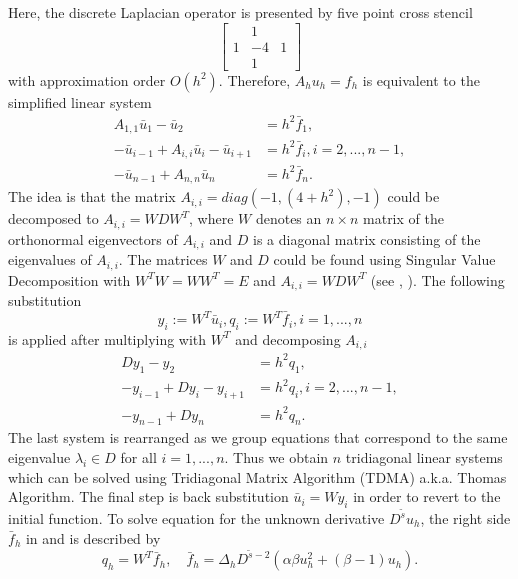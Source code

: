 \documentclass[11pt,a4paper,twoside]{article}
\begin{document}
Here, the discrete Laplacian operator is presented by five point cross stencil
\[
\begin{bmatrix}
            &  1  &  \\
    1     &  -4    & 1\\
            &  1  & 
\end{bmatrix}
\]
with approximation order $O(h^2)$. Therefore, $A_h u_h = f_h$ is equivalent to the simplified linear system
\begin{align}
A_{1,1}\bar u_1 - \bar u_2 &= h^2\bar f_1, \nonumber \\
- \bar u_{i-1}  + A_{i,i}\bar u_i - \bar u_{i+1}  &= h^2\bar f_i, i = 2,...,n-1, \nonumber \\
- \bar u_{n-1} + A_{n,n}\bar u_n &= h^2\bar f_n.\label{LinSys}
\end{align}
The idea is that the matrix $A_{i,i} = diag(-1, (4+h^2), -1)$ could be decomposed to $A_{i,i}  = W D W^T$, where $W$ denotes an $n \times n$ matrix of the orthonormal eigenvectors of $A_{i,i} $ and $ D$ is a diagonal matrix consisting of the eigenvalues of $A_{i,i}$. The matrices $W$ and $D$ could be found using Singular Value Decomposition with $W^T W = W W^T = E$ and $A_{i,i} = WDW^T$ (see \cite{Tref}, \cite{FPS}). The following substitution 
\begin{equation}\label{subst}
y_i := W^T \bar u_i, q_i := W^T \bar f_i, i = 1, ...,n
\end{equation}
is applied after multiplying  with $W^T$ and decomposing $A_{i,i}$
\begin{align}
Dy_1 - y_2 &= h^2 q_1,\nonumber \\
-y_{i-1} + D y_i - y_{i+1} &= h^2 q_i, i = 2,...,n-1,\nonumber \\
- y_{n-1} + Dy_n &= h^2 q_n.\label{SubSys}
\end{align}
The last system  is rearranged as we group equations that correspond to the same eigenvalue $\lambda_i \in D$ for all $i = 1,...,n$. Thus we obtain $n$ tridiagonal linear systems which can be solved using Tridiagonal Matrix Algorithm (TDMA) a.k.a. Thomas Algorithm. The final step is back substitution $\bar u_i = W y_i$ in order to revert to the initial function. To solve equation  for the unknown derivative $D^{\tilde s}u_h$, the right side $\bar f_h$  in  and  is described by
$$
q_h = W^T \bar f_h, \quad \bar f_h = \Delta_h D^{\tilde s - 2} ( \alpha \beta u_h^2  + (\beta -1)u_h).
$$
\end{document}
